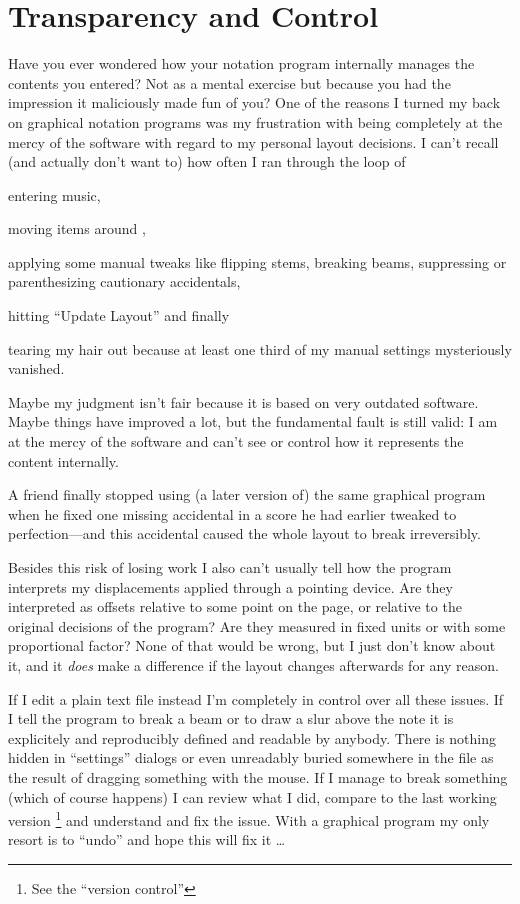 \documentclass[../../LilyPond-Tutorials]{subfiles}
\begin{document}
\section{Transparency and Control}
\label{sec:pt_transparency-and-control}
Have you ever wondered how your notation program internally manages the contents you entered?
Not as a mental exercise but because you had the impression it maliciously made fun of you?
One of the reasons I turned my back on graphical notation programs was my frustration with being completely at the mercy of the software with regard to my personal layout decisions.
I can't recall (and actually don't want to) how often I ran through the loop of
\begin{inparaenum}[1.)]
\item entering music,
\item moving items around ,
\item applying some manual tweaks like flipping stems, breaking beams, suppressing or parenthesizing cautionary accidentals,
\item hitting “Update Layout” and finally
\item tearing my hair out because at least one third of my manual settings mysteriously vanished.
\end{inparaenum}

Maybe my judgment isn't fair because it is based on very outdated software.
Maybe things have improved a lot, but the fundamental fault is still valid: 
I am at the mercy of the software and can't see or control how it represents the content internally.

A friend finally stopped using (a later version of) the same graphical program when he fixed one missing accidental in a score he had earlier tweaked to perfection---and this accidental caused the whole layout to break irreversibly.

Besides this risk of losing work I also can't usually tell how the program interprets my displacements applied through a pointing device.
Are they interpreted as offsets relative to some point on the page, or relative to the original decisions of the program?
Are they measured in fixed units or with some proportional factor?
None of that would be wrong, but I just don't know about it, and it \emph{does} make a difference if the layout changes afterwards for any reason.

\medskip
{}

\medskip
If I edit a plain text file instead I'm completely in control over all these issues.
If I tell the program to break a beam or to draw a slur above the note it is explicitely and reproducibly defined and readable by anybody.
There is nothing hidden in “settings” dialogs or even unreadably buried somewhere in the file as the result of dragging something with the mouse.
If I manage to break something (which of course happens) I can review what I did, compare to the last working version%
\footnote{See the “version control” }
and understand and fix the issue.
With a graphical program my only resort is to “undo” and hope this will fix it \dots
\end{document}

